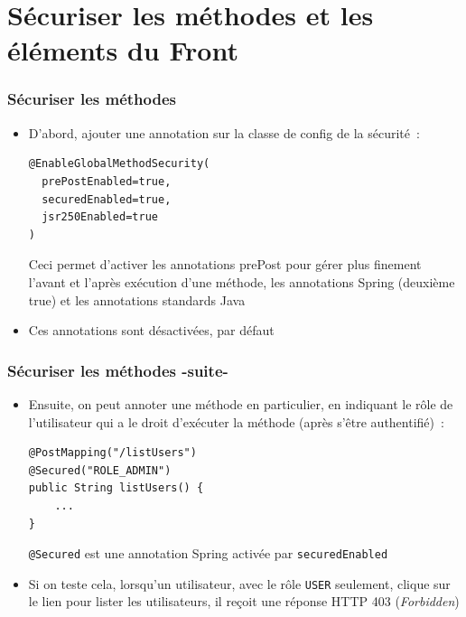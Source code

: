 \documentclass{beamer}
\begin{document}
\section{Sécuriser les méthodes et les éléments du Front}

\begin{frame}[fragile]
	\frametitle{Sécuriser les méthodes}
	\begin{itemize}
		\item D'abord, ajouter une annotation sur la classe de config de la sécurité~:
\begin{lstlisting}
@EnableGlobalMethodSecurity(
  prePostEnabled=true,
  securedEnabled=true,
  jsr250Enabled=true
)
\end{lstlisting}
Ceci permet d'activer les annotations prePost pour gérer plus finement l'avant et l'après exécution d'une méthode, les annotations Spring (deuxième true) et les annotations standards Java
\item Ces annotations sont désactivées, par défaut
	\end{itemize}
\end{frame}

\begin{frame}[fragile]
\frametitle{Sécuriser les méthodes -suite-}
\begin{itemize}
		\item Ensuite, on peut annoter une méthode en particulier, en indiquant le rôle de l'utilisateur qui a le droit d'exécuter la méthode (après s'être authentifié)~:
\begin{lstlisting}
@PostMapping("/listUsers")
@Secured("ROLE_ADMIN")
public String listUsers() {
	...
}
\end{lstlisting}	
\texttt{@Secured} est une annotation Spring activée par \texttt{securedEnabled}
\item Si on teste cela, lorsqu'un utilisateur, avec le rôle \texttt{USER} seulement, clique sur le lien pour lister les utilisateurs, il reçoit une réponse HTTP 403 (\textit{Forbidden})
	\end{itemize}
\end{frame}
\end{document}
